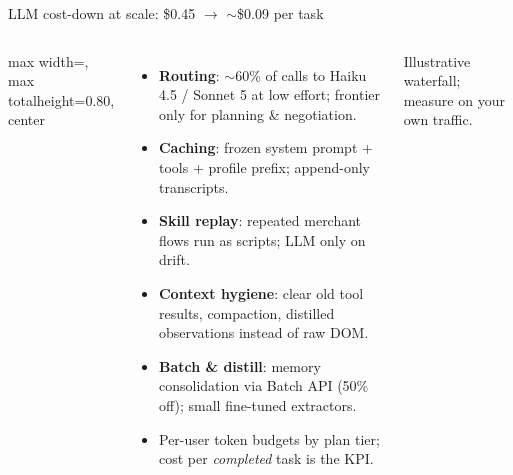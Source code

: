\documentclass[aspectratio=169,10pt]{beamer}
\newenvironment{diagram}{\begin{adjustbox}{max width=\linewidth, max totalheight=0.80\textheight, center}}{\end{adjustbox}}
\begin{document}
\begin{frame}{LLM cost-down at scale: \$0.45 $\rightarrow$ $\sim$\$0.09 per task}
\begin{columns}[c]
\begin{diagram}
\end{diagram}
\scriptsize
\begin{itemize}
  \item \textbf{Routing}: $\sim$60\% of calls to Haiku 4.5 / Sonnet 5 at low effort; frontier only for planning \& negotiation.
  \item \textbf{Caching}: frozen system prompt + tools + profile prefix; append-only transcripts.
  \item \textbf{Skill replay}: repeated merchant flows run as scripts; LLM only on drift.
  \item \textbf{Context hygiene}: clear old tool results, compaction, distilled observations instead of raw DOM.
  \item \textbf{Batch \& distill}: memory consolidation via Batch API (50\% off); small fine-tuned extractors.
  \item Per-user token budgets by plan tier; cost per \emph{completed} task is the KPI.
\end{itemize}
{\tiny\color{slate}Illustrative waterfall; measure on your own traffic.}
\end{columns}
\end{frame}
\end{document}
